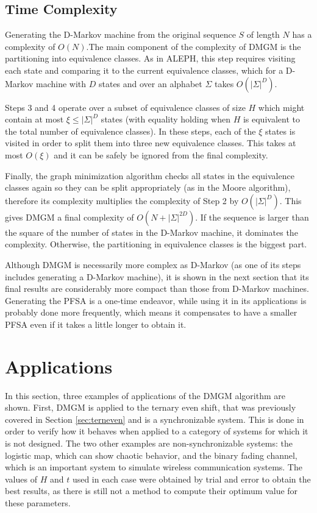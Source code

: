 {\subsection{Time Complexity}

Generating the D-Markov machine from the original sequence $S$ of length $N$ has a complexity of $O(N)$.The main component of the complexity of DMGM is the partitioning into equivalence classes. As in ALEPH, this step requires visiting each state and comparing it to the current equivalence classes, which for a D-Markov machine with $D$ states and over an alphabet $\Sigma$ takes $O(|\Sigma|^D)$. 

Steps 3 and 4 operate over a subset of equivalence classes of size $H$ which might contain at most $\xi \leq |\Sigma|^D$ states (with equality holding when $H$ is equivalent to the total number of equivalence classes). In these steps, each of the $\xi$ states is visited in order to split them into three new equivalence classes. This takes at most $O(\xi)$ and it can be safely be ignored from the final complexity.

Finally, the graph minimization algorithm checks all states in the equivalence classes again so they can be split appropriately (as in the Moore algorithm), therefore its complexity multiplies the complexity of Step 2 by $O(|\Sigma|^D)$. This gives DMGM a final complexity of $O(N + |\Sigma|^{2D})$. If the sequence is larger than the square of the number of states in the D-Markov machine, it dominates the complexity. Otherwise, the partitioning in equivalence classes is the biggest part.

Although DMGM is necessarily more complex as D-Markov (as one of its steps includes generating a D-Markov machine), it is shown in the next section that its final results are considerably more compact than those from D-Markov machines. Generating the PFSA is a one-time endeavor, while using it in its applications is probably done more frequently, which means it compensates to have a smaller PFSA even if it takes a little longer to obtain it. 

\section{Applications}

In this section, three examples of applications of the DMGM algorithm are shown. First, DMGM is applied to the ternary even shift, that was previously covered in Section \ref{sec:terneven} and is a synchronizable system. This is done in order to verify how it behaves when applied to a category of systems for which it is not designed. The two other examples are non-synchronizable systems: the logistic map, which can show chaotic behavior, and the binary fading channel, which is an important system to simulate wireless communication systems.  The values of $H$ and $t$ used in each case were obtained by trial and error to obtain the best results, as there is still not a method to compute their optimum value for these parameters.

}
